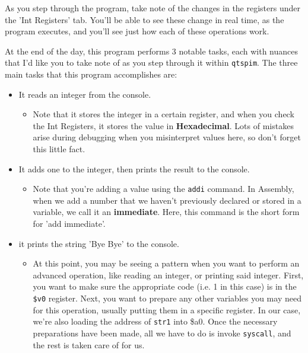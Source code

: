 \documentclass[english, 10pt]{article}
\begin{document}
As you step through the program, take note of the changes in the registers under the 'Int Registers' tab. You'll be able to see these change in real time, as the program executes, and you'll see just how each of these operations work.\newline

At the end of the day, this program performs 3 notable tasks, each with nuances that I'd like you to take note of as you step through it within \texttt{qtspim}. The three main tasks that this program accomplishes are:\newline

\begin{itemize}
	\item It reads an integer from the console.
	\begin{itemize}
		\item Note that it stores the integer in a certain register, and when you check the Int Registers, it stores the value in \textbf{Hexadecimal}. Lots of mistakes arise during debugging when you misinterpret values here, so don't forget this little fact.
	\end{itemize}
	\item It adds one to the integer, then prints the result to the console.
	\begin{itemize}
		\item Note that you're adding a value using the \texttt{addi} command. In Assembly, when we add a number that we haven't previously declared or stored in a variable, we call it an \textbf{immediate}. Here, this command is the short form for 'add immediate'.
	\end{itemize}
	\item it prints the string 'Bye Bye' to the console.
	\begin{itemize}
		\item At this point, you may be seeing a pattern when you want to perform an advanced operation, like reading an integer, or printing said integer. First, you want to make sure the appropriate code (i.e. 1 in this case) is in the \texttt{\$v0} register. Next, you want to prepare any other variables you may need for this operation, usually putting them in a specific register. In our case, we're also loading the address of \texttt{str1} into \$a0. Once the necessary preparations have been made, all we have to do is invoke \texttt{syscall}, and the rest is taken care of for us.
	\end{itemize}
\end{itemize}
\end{document}
